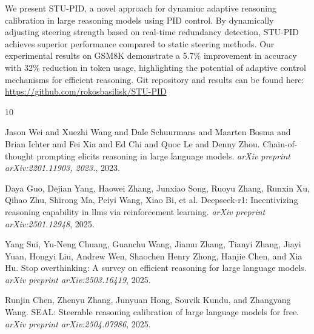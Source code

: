 \documentclass{article}
\begin{document}
We present STU-PID, a novel approach for dynamiuc adaptive reasoning calibration in large reasoning models using PID control. By dynamically adjusting steering strength based on real-time redundancy detection, STU-PID achieves superior performance compared to static steering methods. Our experimental results on GSM8K demonstrate a 5.7\% improvement in accuracy with 32\% reduction in token usage, highlighting the potential of adaptive control mechanisms for efficient reasoning.
\noindent Git repository and results can be found here: \url{https://github.com/rokosbasilisk/STU-PID}
\begin{thebibliography}{10}

Jason Wei and Xuezhi Wang and Dale Schuurmans and Maarten Bosma and Brian Ichter and Fei Xia and Ed Chi and Quoc Le and Denny Zhou.
Chain-of-thought prompting elicits reasoning in large language models.
\textit{arXiv preprint arXiv:2201.11903, 2023.}, 2023.

Daya Guo, Dejian Yang, Haowei Zhang, Junxiao Song, Ruoyu Zhang, Runxin Xu, Qihao Zhu, Shirong Ma, Peiyi Wang, Xiao Bi, et al.
Deepseek-r1: Incentivizing reasoning capability in llms via reinforcement learning.
\textit{arXiv preprint arXiv:2501.12948}, 2025.

Yang Sui, Yu-Neng Chuang, Guanchu Wang, Jiamu Zhang, Tianyi Zhang, Jiayi Yuan, Hongyi Liu, Andrew Wen, Shaochen Henry Zhong, Hanjie Chen, and Xia Hu.
Stop overthinking: A survey on efficient reasoning for large language models.
\textit{arXiv preprint arXiv:2503.16419}, 2025.

Runjin Chen, Zhenyu Zhang, Junyuan Hong, Souvik Kundu, and Zhangyang Wang.
SEAL: Steerable reasoning calibration of large language models for free.
\textit{arXiv preprint arXiv:2504.07986}, 2025.

\end{thebibliography}
\end{document}

